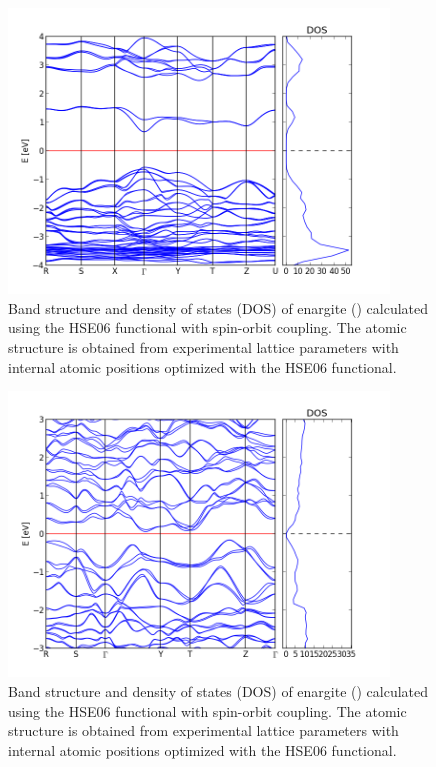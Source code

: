 \begin{figure}[h!]
  \centering
    \includegraphics[width=0.9\textwidth]{figures/enargite_band_structure.png}
    \caption{Band structure and density of states (DOS) of enargite ({\enargite}) calculated using the HSE06 functional with spin-orbit coupling. The atomic structure is obtained from experimental lattice parameters with internal atomic positions optimized with the HSE06 functional.}
  \label{enargite_band_structure}
\end{figure}

\begin{figure}[h!]
  \centering
    \includegraphics[width=0.9\textwidth]{figures/stephanite_band_structure.png}
    \caption{Band structure and density of states (DOS) of enargite ({\stephanite}) calculated using the HSE06 functional with spin-orbit coupling. The atomic structure is obtained from experimental lattice parameters with internal atomic positions optimized with the HSE06 functional.}
  \label{stephanite_band_structure}
\end{figure}

